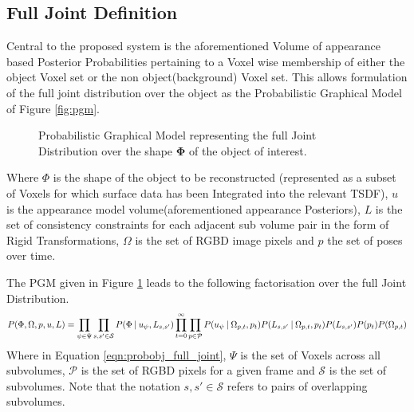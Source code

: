 \subsection{Full Joint Definition}
\label{subsec:probobj_full_joint}
Central to the proposed system is the aforementioned Volume of appearance based
Posterior Probabilities pertaining to a Voxel wise membership of either the
object Voxel set or the non object(background) Voxel set. This allows
formulation of the full joint distribution over the object as the Probabilistic
Graphical Model of Figure \ref{fig:pgm}.

\begin{figure}[ht]
  \label{fig:probobj_pgm1}
  \centering
  \caption[Probabilistic Object Reconstruction Formulation I]
  {Probabilistic Graphical Model representing the full Joint
    Distribution over the shape $\mathbf{\Phi}$ of the object of interest.}
\end{figure}

Where $\Phi$ is the shape of the object to be reconstructed (represented as a
subset of Voxels for which surface data has been Integrated into the relevant
TSDF), $u$ is the appearance model volume(aforementioned appearance Posteriors),
$L$ is the set of consistency constraints for each adjacent sub volume pair in
the form of Rigid Transformations, $\Omega$ is the set of RGBD image pixels and
$p$ the set of poses over time.

The PGM given in Figure \ref{fig:probobj_pgm1} leads to the following
factorisation over the full Joint Distribution.
\begin{equation}
  \label{eqn:probobj_full_joint}
  P(\Phi, \Omega, p, u, L) = 
  \prod_{\psi \in \Psi}\prod_{s, s' \in \mathcal{S}}
  P(\Phi \:\vert\: u_{\psi}, L_{s, s'}) 
  \prod_{t=0}^{\infty}\prod_{p \in \mathcal{P}}
  P(u_{\psi} \:\vert\: \Omega_{p, t}, p_{t})
  P(L_{s, s'} \:\vert\: \Omega_{p, t}, p_{t})
  P(L_{s, s'})P(p_{t})P(\Omega_{p, t})
\end{equation}
Where in Equation \ref{eqn:probobj_full_joint}, $\Psi$ is the set of Voxels
across all subvolumes, $\mathcal{P}$ is the set of RGBD pixels for a given 
frame and $\mathcal{S}$ is the set of subvolumes. Note that the notation
$s, s' \in \mathcal{S}$ refers to pairs of overlapping subvolumes.


